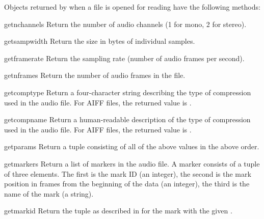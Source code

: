 Objects returned by  when a file is opened for
reading have the following methods:

\begin{methoddesc}[aifc]{getnchannels}{}
Return the number of audio channels (1 for mono, 2 for stereo).
\end{methoddesc}

\begin{methoddesc}[aifc]{getsampwidth}{}
Return the size in bytes of individual samples.
\end{methoddesc}

\begin{methoddesc}[aifc]{getframerate}{}
Return the sampling rate (number of audio frames per second).
\end{methoddesc}

\begin{methoddesc}[aifc]{getnframes}{}
Return the number of audio frames in the file.
\end{methoddesc}

\begin{methoddesc}[aifc]{getcomptype}{}
Return a four-character string describing the type of compression used
in the audio file.  For AIFF files, the returned value is
.
\end{methoddesc}

\begin{methoddesc}[aifc]{getcompname}{}
Return a human-readable description of the type of compression used in
the audio file.  For AIFF files, the returned value is .
\end{methoddesc}

\begin{methoddesc}[aifc]{getparams}{}
Return a tuple consisting of all of the above values in the above
order.
\end{methoddesc}

\begin{methoddesc}[aifc]{getmarkers}{}
Return a list of markers in the audio file.  A marker consists of a
tuple of three elements.  The first is the mark ID (an integer), the
second is the mark position in frames from the beginning of the data
(an integer), the third is the name of the mark (a string).
\end{methoddesc}

\begin{methoddesc}[aifc]{getmark}{id}
Return the tuple as described in  for the mark
with the given .
\end{methoddesc}

